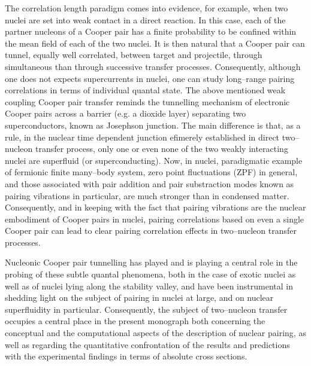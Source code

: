 The correlation length paradigm comes into evidence, for example, when two nuclei are set into weak contact in a direct reaction. In this case, each of the partner nucleons of a Cooper pair has a finite probability to be confined within the mean field of each of the two nuclei. It is then natural that a Cooper pair can tunnel, equally well correlated, between target and projectile, through simultaneous than through successive transfer processes. Consequently, although one does not expects supercurrents in nuclei, one can study long--range pairing correlations in terms of individual quantal state. The above mentioned weak coupling Cooper pair transfer reminds  the tunnelling mechanism of electronic Cooper pairs across a barrier (e.g. a dioxide layer) separating two superconductors, known as Josephson junction. The main difference is that, as a rule, in the nuclear time dependent junction efimerely established in  direct two--nucleon transfer process, only one or even none of the two weakly interacting nuclei are superfluid (or superconducting). Now, in nuclei, paradigmatic example of fermionic  finite many--body system, zero point fluctuations  (ZPF) in general, and those associated with pair addition and pair substraction modes known as pairing vibrations in particular, are much stronger than in condensed matter. Consequently, and in keeping with the fact that pairing vibrations are the nuclear embodiment of Cooper pairs in nuclei,   pairing correlations based on even  a single Cooper pair can lead to clear pairing correlation effects in two--nucleon transfer processes. 


 Nucleonic Cooper pair tunnelling has played and is playing a central role in the probing of these subtle quantal phenomena, both in the case of  exotic nuclei as well as of nuclei lying along the stability valley, and have been instrumental in shedding light on the subject of pairing in nuclei at large, and on nuclear superfluidity in particular. Consequently, the subject of two--nucleon transfer occupies  a central place in the present monograph both concerning the conceptual and the computational aspects of the description of nuclear pairing, as well as regarding the quantitative confrontation of the results and predictions with the experimental findings in terms of absolute cross sections.

